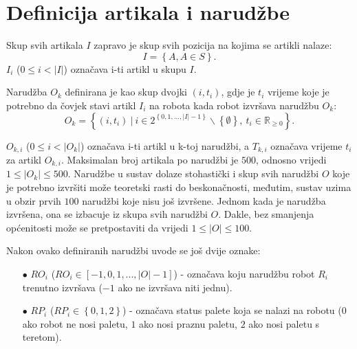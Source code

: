 \documentclass[times, utf8, seminar]{fer}
\begin{document}
\pagebreak

\section{Definicija artikala i narudžbe}
Skup svih artikala $I$ zapravo je skup svih pozicija na kojima se artikli nalaze:
\begin{equation}
I = \left\{A, A \in S\right\}.
\end{equation}
$I_i$ ($0 \le i < |I|$) označava i-ti artikl u skupu $I$.

Narudžba $O_k$ definirana
je kao skup dvojki $(i, t_{i})$, gdje je $t_{i}$ vrijeme koje je potrebno
da čovjek stavi artikl $I_i$ na robota kada robot izvršava narudžbu $O_k$:
\begin{equation}
O_k = \left\{ (i, t_{i})\ |\ i \in 2^{\left\{0, 1, ..., |I|-1\right\}}\backslash\left\{\emptyset\right\},\ t_{i} \in \mathbb{R}_{\ge0}\right\}.
\end{equation}

$O_{k, i}$ ($0 \le i < |O_k|$) označava i-ti artikl u k-toj narudžbi, a $T_{k, i}$ označava
vrijeme $t_i$ za artikl $O_{k, i}$. Maksimalan broj artikala po narudžbi
je $500$, odnosno vrijedi $1 \le |O_k| \le 500$. Narudžbe u sustav dolaze stohastički
i skup svih narudžbi $O$ koje je potrebno izvršiti može teoretski rasti do beskonačnosti,
međutim, sustav uzima u obzir prvih $100$ narudžbi koje nisu još izvršene. Jednom kada
je narudžba izvršena, ona se izbacuje iz skupa svih narudžbi $O$. Dakle, bez smanjenja općenitosti
može se pretpostaviti da vrijedi $1 \le |O| \le 100$.

Nakon ovako definiranih narudžbi uvode se još dvije oznake:
\begin{itemize}
    \item[$\bullet$] $RO_{i}$ ($RO_{i} \in [-1, 0, 1, ..., |O| - 1]$) - označava koju narudžbu
                     robot $R_i$ trenutno izvršava ($-1$ ako ne izvršava niti jednu).
    \item[$\bullet$] $RP_{i}$ ($RP_{i} \in \left\{0, 1, 2\right\}$) - označava status palete
                     koja se nalazi na robotu ($0$ ako robot ne nosi paletu, $1$ ako nosi praznu paletu, $2$ ako nosi paletu s teretom).
\end{itemize}
\end{document}
